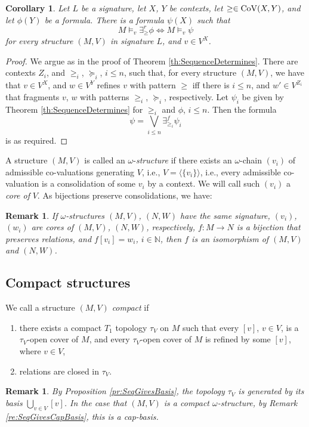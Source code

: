 \documentclass[12pt]{amsart}
\theoremstyle{plain}
\newtheorem{corollary}[theorem]{\bf Corollary}
\newtheorem{remark}[theorem]{\bf Remark}
\newcommand \Val{{\rm{CoV}}}
\newcommand \fr{\scriptscriptstyle{f}}
\newcommand \re{\scriptstyle{r}}
\newcommand \NN{\mathbb{N}}
\begin{document}
\begin{corollary}
	Let $L$ be a signature, let $X$, $Y$ be contexts, let $\geq \in \Val(X,Y)$, and let $\phi(Y)$ be a formula. There is a formula $\psi(X)$ such that $$M \vDash_v \exists^{\re}_\geq \phi \iff M \vDash_v  \psi$$ for every structure $(M,V)$ in signature $L$, and $v \in V^X$.
\end{corollary}

\begin{proof}
We argue as in the proof of Theorem \ref{th:SequenceDetermines}. There are contexts $Z_i$, and $\geq_i$,  $\succeq_i$, $i \leq n$, such that, for every structure $(M,V)$, we have that $v \in V^X$, and $w \in V^Y$ refines $v$ with pattern $\geq$ iff there is $i \leq n$, and $w' \in V^{Z_i}$ that fragments $v$, $w$ with patterns $\geq_i$, $\succeq_i$, respectively.  Let $\psi_i$ be given by Theorem \ref{th:SequenceDetermines} for $\geq_i$ and $\phi$, $i \leq n$. Then the formula $$\psi=\bigvee_{i \leq n} \exists^{\fr}_{\geq_i} \psi_i$$ is as required.
\end{proof}

A structure $(M,V)$ is called an $\omega$-\emph{structure} if there exists an $\omega$-chain $(v_i)$  of admissible co-valuations generating $V$, i.e., $V=\langle \{v_i\} \rangle$, i.e., every admissible co-valuation is a consolidation of some $v_i$ by a context. We will call such $(v_i)$ a \emph{core of} $V$.  As bijections preserve consolidations, we have:
%
\begin{remark}
\label{re:CoreIsomorphism}
If $\omega$-structures $(M,V)$, $(N,W)$ have the same signature, $(v_i)$, $(w_i)$ are cores of $(M,V)$, $(N,W)$, respectively, $f:M \to N$ is  a bijection that preserves relations, and $f[v_i]=w_i$, $i \in \NN$, then $f$ is an isomorphism of $(M,V)$ and $(N,W)$.
\end{remark}

\subsection{Compact structures}

We call a structure $(M,V)$ \emph{compact} if
	\begin{enumerate}
		\item there exists a compact $T_1$ topology $\tau_V$ on $M$ such that every $[v]$, $v \in V$, is a $\tau_V$-open cover of $M$, and every $\tau_V$-open cover of $M$ is refined by some $[v]$, where $v \in V$,
		\item relations are closed in $\tau_V$.
	\end{enumerate}
\begin{remark}
By Proposition \ref{pr:SeqGivesBasis}, the topology $\tau_V$ is generated by its basis $\bigcup_{v \in V} [v]$. In the case that $(M,V)$ is a compact $\omega$-structure, by Remark \ref{re:SeqGivesCapBasis}, this is a cap-basis.
\end{remark}
\end{document}
